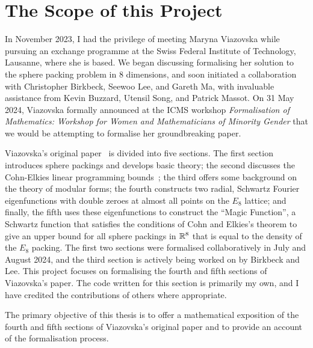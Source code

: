 \section{The Scope of this Project}


In November 2023, I had the privilege of meeting Maryna Viazovska while pursuing an exchange programme at the Swiss Federal Institute of Technology, Lausanne, where she is based. We began discussing formalising her solution to the sphere packing problem in $8$ dimensions, and soon initiated a collaboration with Christopher Birkbeck, Seewoo Lee, and Gareth Ma, with invaluable assistance from Kevin Buzzard, Utensil Song, and Patrick Massot. On 31 May 2024, Viazovska formally announced at the ICMS workshop \textit{Formalisation of Mathematics: Workshop for Women and Mathematicians of Minority Gender} that we would be attempting to formalise her groundbreaking paper.

Viazovska's original paper~\cite{Viazovska8} is divided into five sections. The first section introduces sphere packings and develops basic theory; the second discusses the Cohn-Elkies linear programming bounds~\cite[Theorem 3.1]{CohnElkies}; the third offers some background on the theory of modular forms; the fourth constructs two radial, Schwartz Fourier eigenfunctions with double zeroes at almost all points on the $E_8$ lattice; and finally, the fifth uses these eigenfunctions to construct the ``Magic Function'', a Schwartz function that satisfies the conditions of Cohn and Elkies's theorem to give an upper bound for all sphere packings in $\mathbb{R}^8$ that is equal to the density of the $E_8$ packing. The first two sections were formalised collaboratively in July and August 2024, and the third section is actively being worked on by Birkbeck and Lee. This project focuses on formalising the fourth and fifth sections of Viazovska's paper. The code written for this section is primarily my own, and I have credited the contributions of others where appropriate.

The primary objective of this thesis is to offer a mathematical exposition of the fourth and fifth sections of Viazovska's original paper and to provide an account of the formalisation process. 